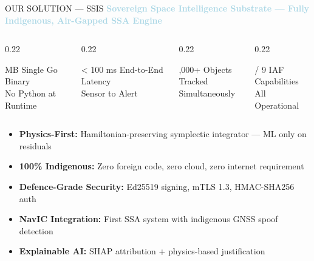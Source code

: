 \documentclass[aspectratio=169,11pt]{beamer}
\begin{document}
\begin{frame}{OUR SOLUTION — SSIS}
\textcolor{lightblue}{\textbf{Sovereign Space Intelligence Substrate — Fully Indigenous, Air-Gapped SSA Engine}}

\vspace{0.3cm}
\begin{columns}[T]
  \begin{column}{0.22\textwidth}
    \begin{block}{ MB}
      \centering\small Single Go Binary\\No Python at Runtime
    \end{block}
  \end{column}
  \begin{column}{0.22\textwidth}
    \begin{block}{\centering < 100 ms}
      \centering\small End-to-End Latency\\Sensor to Alert
    \end{block}
  \end{column}
  \begin{column}{0.22\textwidth}
    \begin{block}{,000+}
      \centering\small Objects Tracked\\Simultaneously
    \end{block}
  \end{column}
  \begin{column}{0.22\textwidth}
    \begin{block}{ / 9}
      \centering\small IAF Capabilities\\All Operational
    \end{block}
  \end{column}
\end{columns}

\vspace{0.4cm}
\begin{itemize}
  \item \textbf{Physics-First:} Hamiltonian-preserving symplectic integrator — ML only on residuals
  \item \textbf{100\% Indigenous:} Zero foreign code, zero cloud, zero internet requirement
  \item \textbf{Defence-Grade Security:} Ed25519 signing, mTLS 1.3, HMAC-SHA256 auth
  \item \textbf{NavIC Integration:} First SSA system with indigenous GNSS spoof detection
  \item \textbf{Explainable AI:} SHAP attribution + physics-based justification
\end{itemize}
\end{frame}
\end{document}
